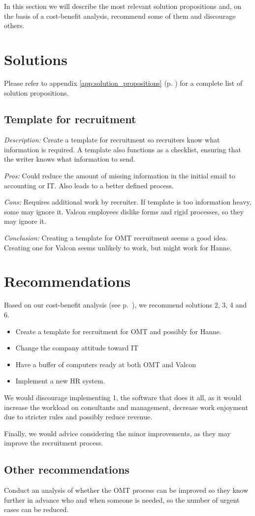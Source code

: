 In this section we will describe the most relevant solution propositions and, on the basis of a cost-benefit analysis, recommend some of them and discourage others.

\section{Solutions}
Please refer to appendix \ref{app:solution_propositions} (p. \pageref{app:solution_propositions}) for a complete list of solution propositions.

\subsection{Template for recruitment}
\emph{Description:} Create a template for recruitment so recruiters know what information is required. A template also functions as a checklist, ensuring that the writer knows what information to send.

\emph{Pros:} Could reduce the amount of missing information in the initial email to accounting or IT. 
Also leads to a better defined process.

\emph{Cons:} Requires additional work by recruiter. 
If template is too information heavy, some may ignore it.
Valcon employees dislike forms and rigid processes, so they may ignore it.

\emph{Conclusion:} Creating a template for OMT recruitment seems a good idea.
Creating one for Valcon seems unlikely to work, but might work for Hanne.

\section{Recommendations}
Based on our cost-benefit analysis (see p.~\pageref{app:cost_benefit_analysis}), we recommend solutions 2, 3, 4 and 6.
\begin{itemize}

\item{Create a template for recruitment for OMT and possibly for Hanne.}
\item{Change the company attitude toward IT}
\item{Have a buffer of computers ready at both OMT and Valcon}
\item{Implement a new HR system.}
\end{itemize}

We would discourage implementing 1, the software that does it all, as it would increase the workload on consultants and management, decrease work enjoyment due to stricter rules and possibly reduce revenue.

Finally, we would advice considering the minor improvements, as they may improve the recruitment process.

\subsection{Other recommendations}
Conduct an analysis of whether the OMT process can be improved so they know further in advance who and when someone is needed, so the number of urgent cases can be reduced.